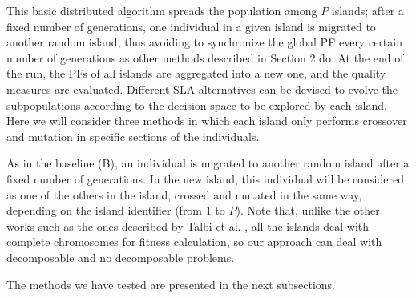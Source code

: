 \documentclass[preprint]{elsarticle}
\begin{document}
This basic distributed algorithm spreads the population among $P$
islands; after a fixed number of generations,
one individual in a given island is migrated to another random island,
thus avoiding to synchronize the global PF every
certain number of generations as other methods described in Section 2
do. At the end of the run, the PFs of all islands are
aggregated into a new one, and the quality measures are evaluated. 
Different  SLA alternatives can be devised to evolve the
subpopulations according to the decision space to be explored by each
island. Here we will consider three methods in which each island only
performs crossover and mutation in specific sections of the
individuals. 



%

As in the baseline (B), an individual is migrated to another random
island after a fixed number of generations. In the new island, this
individual will be considered as one of the others in the island,
crossed and mutated in the same way, depending on the island
identifier (from 1 to $P$). Note that, unlike the other works such as the ones
described by Talbi et al. \citep{Talbi08Parallel}, all the islands deal
with complete chromosomes for fitness calculation, so our approach can
deal with decomposable and no decomposable problems. %

The methods we have tested are presented in the next subsections. 
\end{document}
